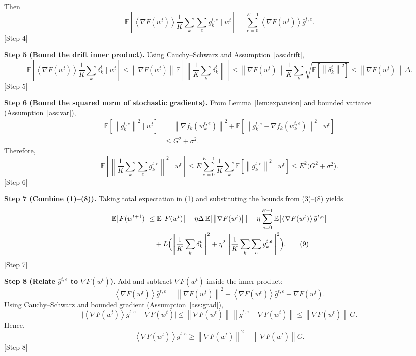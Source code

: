 \documentclass{article}
\newcommand{\E}{\mathbb{E}}
\newcommand{\norm}[1]{\left\lVert#1\right\rVert}
\newcommand{\inner}[1]{\left\langle#1\right\rangle}
\begin{document}
Then
\[
    \E\!\left[\inner{\nabla F(w^{t})}{\frac1K\sum_{k}\sum_{e} g_{k}^{t,e}}\mid w^{t}\right]
    = \sum_{e=0}^{E-1}\inner{\nabla F(w^{t})}{\bar{g}^{t,e}}. \tag{5}
\]
[Step 4]

\noindent\textbf{Step 5 (Bound the drift inner product).}  
Using Cauchy–Schwarz and Assumption~\ref{ass:drift},
\[
    \E\!\left[\inner{\nabla F(w^{t})}{\frac1K\sum_{k}\delta_{k}^{t}}\mid w^{t}\right]
    \le \norm{\nabla F(w^{t})}\,\E\!\left[\norm{\frac1K\sum_{k}\delta_{k}^{t}}\right]
    \le \norm{\nabla F(w^{t})}\,\frac{1}{K}\sum_{k}\sqrt{\E\!\left[\norm{\delta_{k}^{t}}^{2}\right]}
    \le \norm{\nabla F(w^{t})}\,\Delta . \tag{6}
\]
[Step 5]

\noindent\textbf{Step 6 (Bound the squared norm of stochastic gradients).}  
From Lemma~\ref{lem:expansion} and bounded variance (Assumption~\ref{ass:var}),
\begin{align}
    \E\!\left[\norm{g_{k}^{t,e}}^{2}\mid w^{t}\right]
    &= \norm{\nabla f_{k}(w_{k}^{t,e})}^{2} + \E\!\left[\norm{g_{k}^{t,e}-\nabla f_{k}(w_{k}^{t,e})}^{2}\mid w^{t}\right] \nonumber\\
    &\le G^{2} + \sigma^{2}. \tag{7}
\end{align}
Therefore,
\[
    \E\!\left[\norm{\frac1K\sum_{k}\sum_{e} g_{k}^{t,e}}^{2}\mid w^{t}\right]
    \le E\sum_{e=0}^{E-1}\frac1K\sum_{k}\E\!\left[\norm{g_{k}^{t,e}}^{2}\mid w^{t}\right]
    \le E^{2}\bigl(G^{2}+\sigma^{2}\bigr). \tag{8}
\]
[Step 6]

\noindent\textbf{Step 7 (Combine (1)–(8)).}  
Taking total expectation in (1) and substituting the bounds from (3)–(8) yields
\begin{align}
    \E\!\left[F(w^{t+1})\right]
    &\le \E\!\left[F(w^{t})\right] 
       + \eta\Delta\,\E\!\left[\norm{\nabla F(w^{t})}\right]
       -\eta\sum_{e=0}^{E-1}\E\!\left[\inner{\nabla F(w^{t})}{\bar{g}^{t,e}}\right] \nonumber\\
    &\quad + L\Bigl(\norm{\frac1K\sum_{k}\delta_{k}^{t}}^{2}
                + \eta^{2}\norm{\frac1K\sum_{k}\sum_{e} g_{k}^{t,e}}^{2}\Bigr). \tag{9}
\end{align}
[Step 7]

\noindent\textbf{Step 8 (Relate $\bar{g}^{t,e}$ to $\nabla F(w^{t})$).}  
Add and subtract $\nabla F(w^{t})$ inside the inner product:
\[
    \inner{\nabla F(w^{t})}{\bar{g}^{t,e}}
    = \norm{\nabla F(w^{t})}^{2}
      + \inner{\nabla F(w^{t})}{\bar{g}^{t,e}-\nabla F(w^{t})}.
\]
Using Cauchy–Schwarz and bounded gradient (Assumption~\ref{ass:grad}),
\[
    \bigl|\inner{\nabla F(w^{t})}{\bar{g}^{t,e}-\nabla F(w^{t})}\bigr|
    \le \norm{\nabla F(w^{t})}\,\norm{\bar{g}^{t,e}-\nabla F(w^{t})}
    \le \norm{\nabla F(w^{t})}\,G.
\]
Hence,
\[
    \inner{\nabla F(w^{t})}{\bar{g}^{t,e}}
    \ge \norm{\nabla F(w^{t})}^{2} - \norm{\nabla F(w^{t})}G. \tag{10}
\]
[Step 8]
\end{document}
